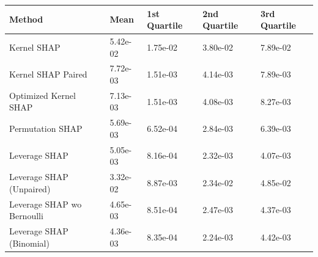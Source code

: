 \begin{tabular}{lllll}
  \toprule
  \textbf{Method} & \textbf{Mean} & \textbf{1st Quartile} & \textbf{2nd Quartile} & \textbf{3rd Quartile} \\ \midrule
Kernel SHAP & 5.42e-02 & 1.75e-02 & 3.80e-02 & 7.89e-02\\
Kernel SHAP Paired & 7.72e-03 & 1.51e-03 & 4.14e-03 & 7.89e-03\\
Optimized Kernel SHAP & 7.13e-03 & 1.51e-03 & 4.08e-03 & 8.27e-03\\
Permutation SHAP & 5.69e-03 & \cellcolor{gold!60}6.52e-04 & 2.84e-03 & 6.39e-03\\
Leverage SHAP & \cellcolor{bronze!60}5.05e-03 & \cellcolor{silver!60}8.16e-04 & \cellcolor{silver!60}2.32e-03 & \cellcolor{gold!60}4.07e-03\\
Leverage SHAP (Unpaired) & 3.32e-02 & 8.87e-03 & 2.34e-02 & 4.85e-02\\
Leverage SHAP wo Bernoulli & \cellcolor{silver!60}4.65e-03 & 8.51e-04 & \cellcolor{bronze!60}2.47e-03 & \cellcolor{silver!60}4.37e-03\\
Leverage SHAP (Binomial) & \cellcolor{gold!60}4.36e-03 & \cellcolor{bronze!60}8.35e-04 & \cellcolor{gold!60}2.24e-03 & \cellcolor{bronze!60}4.42e-03\\
\bottomrule
\end{tabular}

